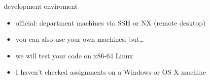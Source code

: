 \begin{frame}{development enviroment}
    \begin{itemize}
    \item official: department machines via SSH or NX (remote desktop)
    \vspace{.5cm}
    \item you can also use your own machines, but\ldots
    \item we will test your code on x86-64 Linux
    \item I haven't checked assignments on a Windows or OS X machine
    \end{itemize}
\end{frame}
